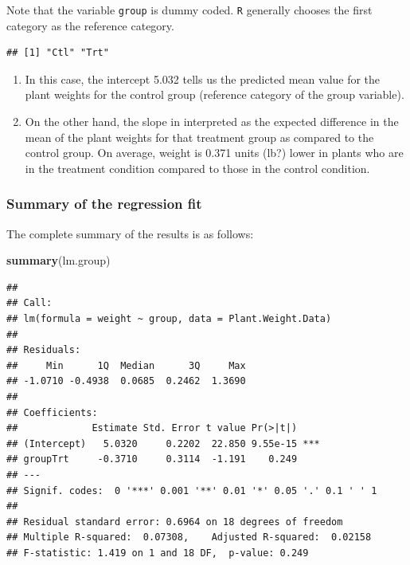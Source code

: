 \documentclass[
]{book}
\newenvironment{Shaded}{\begin{snugshade}}{\end{snugshade}}
\newcommand{\KeywordTok}[1]{\textcolor[rgb]{0.13,0.29,0.53}{\textbf{#1}}}
\newcommand{\NormalTok}[1]{#1}
\newcommand{\OperatorTok}[1]{\textcolor[rgb]{0.81,0.36,0.00}{\textbf{#1}}}
\providecommand{\tightlist}{%
  \setlength{\itemsep}{0pt}\setlength{\parskip}{0pt}}
\begin{document}
Note that the variable \texttt{group} is dummy coded. \texttt{R} generally chooses the first category as the reference category.

\begin{Shaded}
\end{Shaded}

\begin{verbatim}
## [1] "Ctl" "Trt"
\end{verbatim}

\begin{enumerate}
\def\labelenumi{\arabic{enumi}.}
\tightlist
\item
  In this case, the intercept 5.032 tells us the predicted mean value for the plant weights for the control group (reference category of the group variable).
\item
  On the other hand, the slope in interpreted as the expected difference in the mean of the plant weights for that treatment group as compared to the control group. On average, weight is 0.371 units (lb?) lower in plants who are in the treatment condition compared to those in the control condition.
\end{enumerate}

\hypertarget{summary-of-the-regression-fit}{%
\subsubsection{Summary of the regression fit}\label{summary-of-the-regression-fit}}

The complete summary of the results is as follows:

\begin{Shaded}
\begin{Highlighting}[]
\KeywordTok{summary}\NormalTok{(lm.group)}
\end{Highlighting}
\end{Shaded}

\begin{verbatim}
## 
## Call:
## lm(formula = weight ~ group, data = Plant.Weight.Data)
## 
## Residuals:
##     Min      1Q  Median      3Q     Max 
## -1.0710 -0.4938  0.0685  0.2462  1.3690 
## 
## Coefficients:
##             Estimate Std. Error t value Pr(>|t|)    
## (Intercept)   5.0320     0.2202  22.850 9.55e-15 ***
## groupTrt     -0.3710     0.3114  -1.191    0.249    
## ---
## Signif. codes:  0 '***' 0.001 '**' 0.01 '*' 0.05 '.' 0.1 ' ' 1
## 
## Residual standard error: 0.6964 on 18 degrees of freedom
## Multiple R-squared:  0.07308,	Adjusted R-squared:  0.02158 
## F-statistic: 1.419 on 1 and 18 DF,  p-value: 0.249
\end{verbatim}
\end{document}
